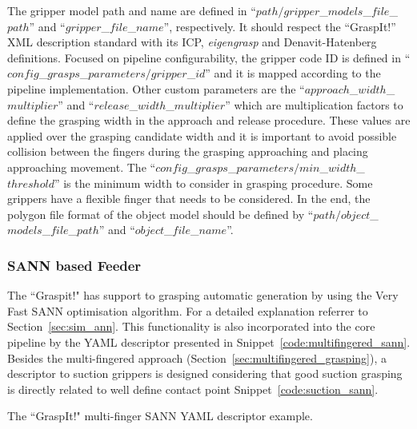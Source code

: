 The gripper model path and name are defined in ``$path/gripper$\_$models$\_$file$\_$path$'' and ``$gripper$\_$file$\_$name$'', respectively. It should respect the ``GraspIt!'' XML description standard with its \ac{ICP}, \textit{eigengrasp} and Denavit-Hatenberg definitions. Focused on pipeline configurability, the gripper code ID is defined in ``$config$\_$grasps$\_$parameters/gripper$\_$id$'' and it is mapped according to the pipeline implementation. Other custom parameters are the ``$approach$\_$width$\_$multiplier$'' and ``$release$\_$width$\_$multiplier$'' which are multiplication factors to define the grasping width in the approach and release procedure. These values are applied over the grasping candidate width and it is important to avoid possible collision between the fingers during the grasping approaching and placing approaching movement.  The ``$config$\_$grasps$\_$parameters/min$\_$width$\_$threshold$'' is the minimum width to consider in grasping procedure. Some grippers have a flexible finger that needs to be considered.
In the end, the polygon file format of the object model should be defined by ``$path/object$\_$models$\_$file$\_$path$'' and ``$object$\_$file$\_$name$''.


\subsubsection{\acl{SANN} based Feeder}
\label{cap4:modular_grasping_architecture:sec:grasping_synthesis:subsec:graspit:subsubsec:sann}

The ``Graspit!" has support to grasping automatic generation by using the Very Fast \acl{SANN} optimisation algorithm. For a detailed explanation referrer to Section~\ref{sec:sim_ann}. This functionality is also incorporated into the core pipeline by the YAML descriptor presented in Snippet~\ref{code:multifingered_sann}. Besides the multi-fingered approach (Section~\ref{sec:multifingered_grasping}), a descriptor to suction grippers is designed considering that good suction grasping is directly related to well define contact point Snippet~\ref{code:suction_sann}.

\begin{snippet}[h!]
\centering
{}
\caption{The ``GraspIt!" multi-finger \ac{SANN} YAML descriptor example.}
\label{code:multifingered_sann}
\end{snippet}


